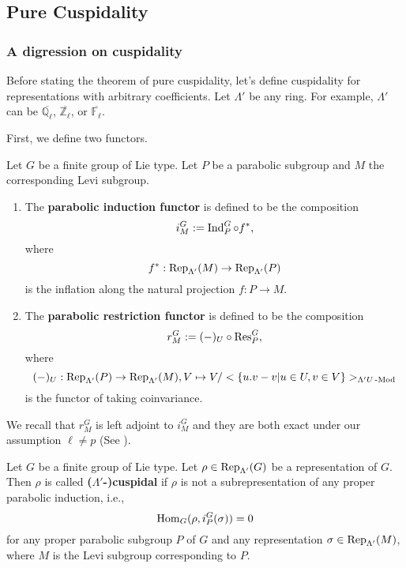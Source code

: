 	
	
	
	\subsection{Pure Cuspidality}
	
	\subsubsection{A digression on cuspidality}
	
	Before stating the theorem of pure cuspidality, let's define cuspidality for representations with arbitrary coefficients. Let $\Lambda'$ be any ring. For example, $\Lambda'$ can be $\overline{\mathbb{Q}_{\ell}}$, $\overline{\mathbb{Z}_{\ell}}$, or $\overline{\mathbb{F}_{\ell}}$.
	
	First, we define two functors.
	
	\begin{definition} 
		Let $G$ be a finite group of Lie type. Let $P$ be a parabolic subgroup and $M$ the corresponding Levi subgroup.
		\begin{enumerate}
			\item The \textbf{parabolic induction functor} is defined to be the composition 
			$$i_M^G:= \operatorname{\operatorname{Ind}}_P^G \circ f^*,$$ where 
			$$f^*: \operatorname{\operatorname{Rep}}_{\Lambda'}(M) \to \operatorname{\operatorname{Rep}}_{\Lambda'}(P)$$
			is the inflation along the natural projection $f: P \to M$. 
			\item The \textbf{parabolic restriction functor} is defined to be the composition 
			$$r_M^G:= (-)_U \circ \operatorname{\operatorname{Res}}_P^G,$$ where 
			$$(-)_U: \operatorname{\operatorname{Rep}}_{\Lambda'}(P) \to \operatorname{\operatorname{Rep}}_{\Lambda'}(M), V \mapsto V/<\{u.v-v | u \in U, v \in V\}>_{\Lambda'U\operatorname{-Mod}}$$
			is the functor of taking coinvariance.
		\end{enumerate}
	\end{definition}
	
	We recall that $r_M^G$ is left adjoint to $i_M^G$ and they are both exact under our assumption $\ell \neq p$ (See \cite[II.2.1]{vigneras1996representations}).
	
	\begin{definition}[Cuspidal]\label{Def Cuspidal}
		Let $G$ be a finite group of Lie type. Let $\rho \in \operatorname{\operatorname{Rep}}_{\Lambda'}(G)$ be a representation of $G$. Then $\rho$ is called \textbf{($\Lambda'$-)cuspidal} if $\rho$ is not a subrepresentation of any proper parabolic induction, i.e., 
		$$\operatorname{\operatorname{Hom}}_{G}(\rho, i_P^G(\sigma))=0$$ 
		for any proper parabolic subgroup $P$ of $G$ and any representation $\sigma \in \operatorname{\operatorname{Rep}}_{\Lambda'}(M)$, where $M$ is the Levi subgroup corresponding to $P$.
	\end{definition}
	
